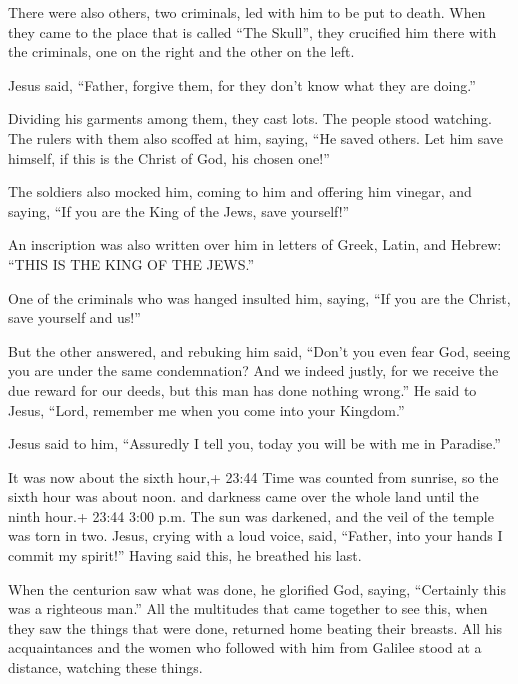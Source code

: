  There were also others, two criminals, led with him to be
put to death.  When they came to the place that is called
``The Skull'', they crucified him there with the criminals, one on the
right and the other on the left.

 Jesus said, ``Father, forgive them, for they don't know
what they are doing.''

Dividing his garments among them, they cast lots.  The
people stood watching. The rulers with them also scoffed at him, saying,
``He saved others. Let him save himself, if this is the Christ of God,
his chosen one!''

 The soldiers also mocked him, coming to him and offering
him vinegar,  and saying, ``If you are the King of the
Jews, save yourself!''

 An inscription was also written over him in letters of
Greek, Latin, and Hebrew: ``THIS IS THE KING OF THE JEWS.''

 One of the criminals who was hanged insulted him, saying,
``If you are the Christ, save yourself and us!''

 But the other answered, and rebuking him said, ``Don't you
even fear God, seeing you are under the same condemnation? 
And we indeed justly, for we receive the due reward for our deeds, but
this man has done nothing wrong.''  He said to Jesus,
``Lord, remember me when you come into your Kingdom.''

 Jesus said to him, ``Assuredly I tell you, today you will
be with me in Paradise.''

 It was now about the sixth hour,+ 23:44 Time was counted
from sunrise, so the sixth hour was about noon. and darkness came over
the whole land until the ninth hour.+ 23:44 3:00 p.m.  The
sun was darkened, and the veil of the temple was torn in two.
 Jesus, crying with a loud voice, said, ``Father, into your
hands I commit my spirit!'' Having said this, he breathed his last.

 When the centurion saw what was done, he glorified God,
saying, ``Certainly this was a righteous man.''  All the
multitudes that came together to see this, when they saw the things that
were done, returned home beating their breasts.  All his
acquaintances and the women who followed with him from Galilee stood at
a distance, watching these things.

